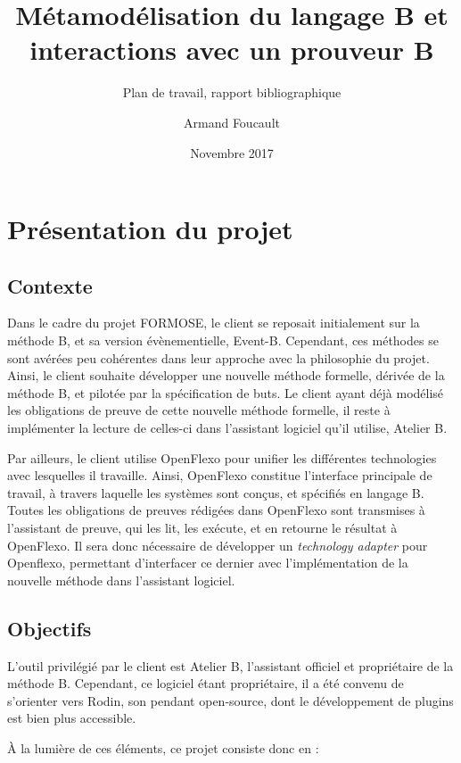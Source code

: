 \documentclass{article}
\author{Armand Foucault}
\date{Novembre 2017}
\title{Métamodélisation du langage B et \mbox{interactions} avec un prouveur B}
\subtitle{Plan de travail, rapport bibliographique}
\begin{document}
\imtaMaketitlepage

\tableofcontents

\newpage


\section{Présentation du projet}

\subsection{Contexte}

Dans le cadre du projet FORMOSE, le client se reposait initialement sur la méthode B, et sa version évènementielle, Event-B.
Cependant, ces méthodes se sont avérées peu cohérentes dans leur approche avec la philosophie du projet.
Ainsi, le client souhaite développer une nouvelle méthode formelle, dérivée de la méthode B, et pilotée par la spécification de buts.
Le client ayant déjà modélisé les obligations de preuve de cette nouvelle méthode formelle, il reste à implémenter la lecture de celles-ci dans l'assistant logiciel qu'il utilise, Atelier B.

Par ailleurs, le client utilise OpenFlexo pour unifier les différentes technologies avec lesquelles il travaille.
Ainsi, OpenFlexo constitue l'interface principale de travail, à travers laquelle les systèmes sont conçus, et spécifiés en langage B.
Toutes les obligations de preuves rédigées dans OpenFlexo sont transmises à l'assistant de preuve, qui les lit, les exécute, et en retourne le résultat à OpenFlexo.
Il sera donc nécessaire de développer un \textit{technology adapter} pour Openflexo, permettant d'interfacer ce dernier avec l'implémentation de la nouvelle méthode dans l'assistant logiciel.\\

\subsection{Objectifs}

L'outil privilégié par le client est Atelier B, l'assistant officiel et propriétaire de la méthode B.
Cependant, ce logiciel étant propriétaire, il a été convenu de s'orienter vers Rodin, son pendant open-source, dont le développement de plugins est bien plus accessible.

À la lumière de ces éléments, ce projet consiste donc en :
\end{document}
